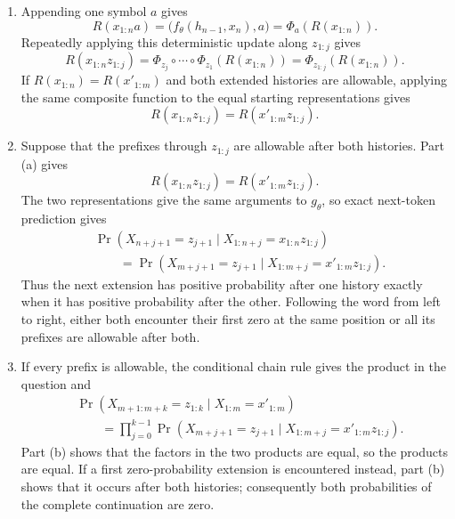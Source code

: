 \documentclass[11pt]{article}
\begin{document}
\begin{solution}[ex:p2-4]
    \begin{enumerate}
      \item Appending one symbol $a$ gives
        \[
          R(x_{1:n}a)
            =\bigl(f_\theta(h_{n-1},x_n),a\bigr)
            =\Phi_a\!\left(R(x_{1:n})\right).
        \]
        Repeatedly applying this deterministic update along $z_{1:j}$ gives
        \[
          R(x_{1:n}z_{1:j})
            =\Phi_{z_j}\circ\cdots\circ\Phi_{z_1}
              \!\left(R(x_{1:n})\right)
            =\Phi_{z_{1:j}}\!\left(R(x_{1:n})\right).
        \]
        If $R(x_{1:n})=R(x'_{1:m})$ and both extended histories are
        allowable, applying the same composite function to the equal starting
        representations gives
        \[
          R(x_{1:n}z_{1:j})=R(x'_{1:m}z_{1:j}).
        \]

      \item Suppose that the prefixes through $z_{1:j}$ are allowable after
        both histories. Part (a) gives
        \[
          R(x_{1:n}z_{1:j})
            =R(x'_{1:m}z_{1:j}).
        \]
        The two representations give the same arguments to $g_\theta$, so
        exact next-token prediction gives
        \[
          \begin{aligned}
          &\Pr\!\left(
            X_{n+j+1}=z_{j+1}
            \mid X_{1:n+j}=x_{1:n}z_{1:j}
          \right)\\
          &\qquad=
          \Pr\!\left(
            X_{m+j+1}=z_{j+1}
            \mid X_{1:m+j}=x'_{1:m}z_{1:j}
          \right).
          \end{aligned}
        \]
        Thus the next extension has positive probability after one history
        exactly when it has positive probability after the other. Following
        the word from left to right, either both encounter their first zero at
        the same position or all its prefixes are allowable after both.

      \item If every prefix is allowable, the conditional chain rule gives
        the product in the question and
        \[
          \begin{aligned}
          &\Pr\!\left(
            X_{m+1:m+k}=z_{1:k}\mid X_{1:m}=x'_{1:m}
          \right)\\
          &\qquad=
          \prod_{j=0}^{k-1}
          \Pr\!\left(
            X_{m+j+1}=z_{j+1}
            \mid X_{1:m+j}=x'_{1:m}z_{1:j}
          \right).
          \end{aligned}
        \]
        Part (b) shows that the factors in the two products are equal, so the
        products are equal. If a first zero-probability extension is
        encountered instead, part (b) shows that it occurs after both
        histories; consequently both probabilities of the complete
        continuation are zero.


\end{enumerate}
\end{solution}
\end{document}
